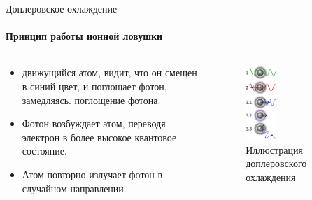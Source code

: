 \documentclass{beamer}
\begin{document}
    \begin{frame}{Доплеровское охлаждение}
    \framesubtitle{Принцип работы ионной ловушки}
        \begin{columns}

        \begin{column}{0.5\textwidth}

            \begin{itemize}
            		\item движущийся атом, видит, что он смещен в синий цвет, и поглощает фотон, замедляясь. поглощение фотона.
                \item Фотон возбуждает атом, переводя электрон в более высокое квантовое состояние.
                \item Атом повторно излучает фотон в случайном направлении.
            \end{itemize}

        \end{column}

        \begin{column}{0.5\textwidth}
            \begin{figure}
                \centering
                \includegraphics[width=0.35\textwidth]{media/dopler-cooling.png}
                \caption{Иллюстрация доплеровского охлаждения}
            \end{figure}
        \end{column}

        \end{columns}

    \end{frame}
\end{document}
